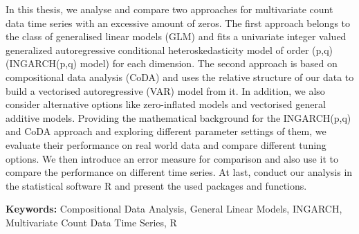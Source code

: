 In this thesis, we analyse and compare two approaches for multivariate count data time series with an excessive amount of zeros. The first approach belongs to the class of generalised linear models (GLM) and fits a univariate integer valued generalized autoregressive conditional heteroskedasticity model of order (p,q) (INGARCH(p,q) model) for each dimension. The second approach is based on compositional data analysis (CoDA) and uses the relative structure of our data to build a vectorised autoregressive (VAR) model from it. In addition, we also consider alternative options like zero-inflated models and vectorised general additive models. Providing the mathematical background for the INGARCH(p,q) and CoDA approach and exploring different parameter settings of them, we evaluate their performance on real world data and compare different tuning options. We then introduce an error measure for comparison and also use it to compare the performance on different time series. At last, conduct our analysis in the statistical software R and present the used packages and functions. \newline

\textbf{Keywords:} Compositional Data Analysis, General Linear Models, INGARCH, Multivariate Count Data Time Series, R